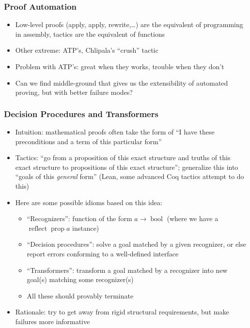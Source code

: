\documentclass{beamer}
\begin{document}
\begin{frame}
  \frametitle{Proof Automation}
  \begin{itemize}
    \item Low-level proofs (apply, apply, rewrite,\ldots) are the
      equivalent of programming in assembly, tactics are the
      equivalent of functions
    \item Other extreme: ATP's, Chlipala's ``crush'' tactic
    \item Problem with ATP's: great when they works, trouble when they don't
    \item Can we find middle-ground that gives us the extensibility of
      automated proving, but with better failure modes?
  \end{itemize}
\end{frame}

\begin{frame}
  \frametitle{Decision Procedures and Transformers}
  \begin{itemize}
    \item Intuition: mathematical proofs often take the form of ``I
      have these preconditions and a term of this particular form''
    \item Tactics: ``go from a proposition of this exact structure and
      truths of this exact structure to propositions of this exact
      structure''; generalize this into ``goals of this \emph{general} form''
      (Lean, some advanced Coq tactics attempt to do this)
    \item Here are some possible idioms based on this idea:
      \begin{itemize}
        \item ``Recognizers'': function of the form $a \rightarrow
          \operatorname{bool}$ (where we have a $\operatorname{reflect}
          \operatorname{prop} a$ instance)
        \item ``Decision procedures'': solve a goal matched by a given
          recognizer, or else report errors conforming to a
          well-defined interface
        \item ``Transformers'': transform a goal matched by a
          recognizer into new goal(s) matching some recognizer(s)
        \item All these should provably terminate
      \end{itemize}
    \item Rationale: try to get away from rigid structural
      requirements, but make failures more informative
  \end{itemize}
\end{frame}
\end{document}

